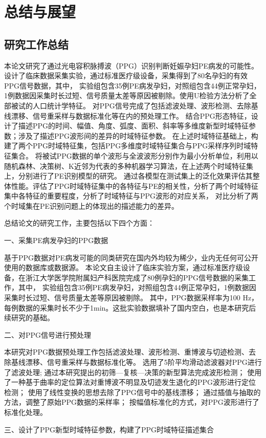 \chapter{总结与展望}
\section{研究工作总结}
本论文研究了通过光电容积脉搏波（PPG）识别判断妊娠孕妇PE病发的可能性。设计了临床数据采集实验，通过标准医疗级设备，采集得到了80名孕妇的有效PPG信号数据，其中，
实验组包含35例PE病发孕妇，对照组包含44例正常孕妇，1例数据因采集时长过短、信号质量太差等原因被剔除。使用U检验方法分析了全部被试的人口统计学特征。
对PPG信号完成了包括滤波处理、波形检测、去除基线漂移、信号重采样与数据标准化等在内的预处理工作。
结合PPG形态特征，设计了描述PPG的时间、幅值、角度、弧度、面积、斜率等多维度新型时域特征参数；涉及了描述PPG波形间的差异的时域特征参数。
在上述时域特征基础上，构建了两个PPG时域特征集，包括PPG多维度时域特征集合与PPG采样序列时域特征集合。
将被试PPG数据的单个波形与全波波形分别作为最小分析单位，利用以随机森林、决策树、K近邻为代表的多种机器学习算法，在上述两个时域特征集上，分别进行了PE识别模型的研究。
通过各模型在测试集上的泛化效果评估其整体性能。评估了PPG时域特征集中的各特征与PE的相关性，分析了两个时域特征集中各特征的重要程度，分析了时域特征与PPG波形的对应关系，
对比分析了两个时域集在PE识别问题上的体现出的描述能力的差异。

总结论文的研究工作，主要包括以下四个方面：

一、采集PE病发孕妇的PPG数据

基于PPG数据对PE病发可能的同类研究在国内外均较为稀少，业内无任何可公开使用的数据库或数据源。
本论文自主设计了临床实验方案，通过标准医疗级设备，在浙江大学医学院附属妇产科医院完成了80例孕妇的PPG信号数据的采集工作，其中，
实验组包含35例PE病发孕妇，对照组包含44例正常孕妇，1例数据因采集时长过短、信号质量太差等原因被剔除。
其中，PPG数据采样率为100 Hz，每例数据的采集时长不少于1min。这批实验数据填补了国内空白，也是本研究后续研究的基础。

二、对PPG信号进行预处理

本研究对PPG数据预处理工作包括滤波处理、波形检测、重博波与切迹检测、去除基线漂移、信号重采样与数据标准化等。
选用了5阶平均滑动滤波器对PPG进行了滤波处理;
通过本研究提出的初筛—复核—决策的新型算法完成波形检测；
使用了一种基于曲率的定位算法对重博波不明显及切迹发生退化的PPG波形进行定位检测；
使用了线性变换的思想去除了PPG信号中的基线漂移；
通过插值与抽取的方法，调整了原始PPG数据的采样率；
按幅值标准化的方式，对PPG波形进行了标准化处理。

三、设计了PPG新型时域特征参数，构建了PPG时域特征描述集合

